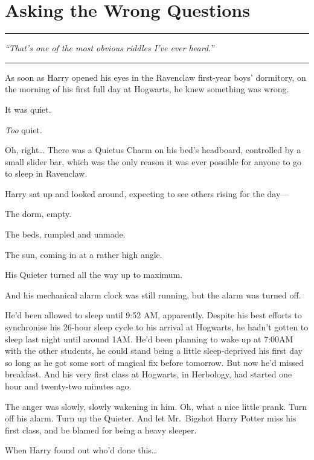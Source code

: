 \chapter{Asking the Wrong Questions}

\begin{center}\rule{3in}{0.4pt}\end{center}

\emph{``That's one of the most obvious riddles I've ever heard.''}

\begin{center}\rule{3in}{0.4pt}\end{center}

As soon as Harry opened his eyes in the Ravenclaw first-year boys'
dormitory, on the morning of his first full day at Hogwarts, he knew
something was wrong.

It was quiet.

\emph{Too} quiet.

Oh, right\ldots{} There was a Quietus Charm on his bed's headboard,
controlled by a small slider bar, which was the only reason it was ever
possible for anyone to go to sleep in Ravenclaw.

Harry sat up and looked around, expecting to see others rising for the
day---

The dorm, empty.

The beds, rumpled and unmade.

The sun, coming in at a rather high angle.

His Quieter turned all the way up to maximum.

And his mechanical alarm clock was still running, but the alarm was
turned off.

He'd been allowed to sleep until 9:52 AM, apparently. Despite his best
efforts to synchronise his 26-hour sleep cycle to his arrival at
Hogwarts, he hadn't gotten to sleep last night until around 1AM. He'd
been planning to wake up at 7:00AM with the other students, he could
stand being a little sleep-deprived his first day so long as he got some
sort of magical fix before tomorrow. But now he'd missed breakfast. And
his very first class at Hogwarts, in Herbology, had started one hour and
twenty-two minutes ago.

The anger was slowly, slowly wakening in him. Oh, what a nice little
prank. Turn off his alarm. Turn up the Quieter. And let Mr.~Bigshot
Harry Potter miss his first class, and be blamed for being a heavy
sleeper.

When Harry found out who'd done this\ldots{}

